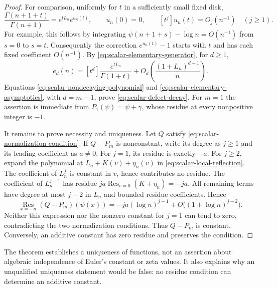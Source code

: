 \documentclass[11pt,a4paper]{article}
\numberwithin{equation}{section}
\theoremstyle{definition}
\begin{document}
\begin{proof}
For comparison, uniformly for $t$ in a sufficiently small fixed disk,
\begin{equation}
 \frac{\Gamma(n+1+t)}{\Gamma(n+1)}
    =e^{tL_n}e^{u_n(t)},\qquad
 u_n(0)=0,\qquad [t^j]u_n(t)=O_j(n^{-1})\quad(j\geq1).
 \label{eq:scalar-gamma-ratio-error}
\end{equation}
For example, this follows by integrating
$\psi(n+1+s)-\log n=O(n^{-1})$ from $s=0$ to $s=t$.
Consequently the correction $e^{u_n(t)}-1$ starts with $t$ and
has each fixed coefficient $O(n^{-1})$.  By
\eqref{eq:scalar-elementary-generator}, for $d\geq1$,
\begin{equation}
 e_d(n)=[t^d]\frac{e^{tL_n}}{\Gamma(1+t)}
       +O_d\!\left(\frac{(1+L_n)^{d-1}}{n}\right).
 \label{eq:scalar-elementary-asymptotics}
\end{equation}
Equations \eqref{eq:scalar-nondecaying-polynomial} and
\eqref{eq:scalar-elementary-asymptotics}, with $d=m-1$, prove
\eqref{eq:scalar-defect-decay}.  For $m=1$ the assertion is
immediate from $P_1(\psi)=\psi+\gamma$, whose residue at every
nonpositive integer is $-1$.

It remains to prove necessity and uniqueness.  Let $Q$ satisfy
\eqref{eq:scalar-normalization-condition}.  If $Q-P_m$ is
nonconstant, write its degree as $j\geq1$ and its leading
coefficient as $a\ne0$.  For $j=1$, its residue is exactly
$-a$.  For $j\geq2$, expand the polynomial at
$L_n+K(v)+\eta_n(v)$ in \eqref{eq:scalar-local-reflection}.
The coefficient of $L_n^j$ is constant in $v$, hence contributes
no residue.  The coefficient of $L_n^{j-1}$ has residue
$ja\operatorname*{Res}_{v=0}(K+\eta_n)=-ja$.  All remaining
terms have degree at most $j-2$ in $L_n$ and bounded residue
coefficients.  Hence
\begin{equation}
 \operatorname*{Res}_{x=-n}(Q-P_m)(\psi(x))
      =-ja(\log n)^{j-1}
          +O\bigl((1+\log n)^{j-2}\bigr).
 \label{eq:scalar-uniqueness-leading-term}
\end{equation}
Neither this expression nor the nonzero constant for $j=1$ can
tend to zero, contradicting the two normalization conditions.
Thus $Q-P_m$ is constant.  Conversely, an additive constant has
zero residue and preserves the condition.
\end{proof}

The theorem establishes a uniqueness of functions, not an assertion
about algebraic independence of Euler's constant or zeta values.
It also explains why an unqualified uniqueness statement would be
false: no residue condition can determine an additive constant.
\end{document}
